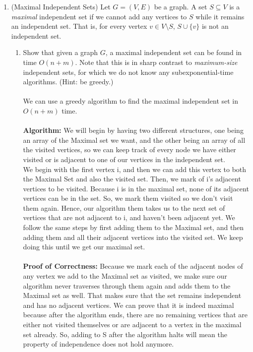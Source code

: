 \documentclass[11pt]{article}
\begin{document}
\begin{enumerate}
 \item (Maximal Independent Sets) \label{prob:maximalIS} Let $G=(V,E)$ be a graph.  A set $S\subseteq V$ is a {\em maximal} independent set if we cannot add any vertices to $S$ while it remains an independent set.  That is, for every vertex $v\in V\setminus S$, $S\cup\{v\}$ is not an independent set.
    \begin{enumerate}
        \item Show that given a graph $G$, a maximal independent set can be found in time $O(n+m)$.  Note that this is in sharp contrast to {\em maximum-size} independent sets, for which we do not know any subexponential-time algorithms. (Hint: be greedy.)
        \\\\ We can use a greedy algorithm to find the maximal independent set in $O(n + m)$ time.
        \\\\ \textbf{Algorithm: }We will begin by having two different structures, one being an array of the Maximal set we want, and the other being an array of all the visited vertices, so we can keep track of every node we have either visited or is adjacent to one of our vertices in the independent set.
        \\ We begin with the first vertex i, and then we can add this vertex to both the Maximal Set and also the visited set. Then, we mark of i's adjacent vertices to be visited. Because i is in the maximal set, none of its adjacent vertices can be in the set. So, we mark them visited so we don't visit them again. Hence, our algorithm them takes us to the next set of vertices that are not adjacent to i, and haven't been adjacent yet. We follow the same steps by first adding them to the Maximal set, and then adding them and all their adjacent vertices into the visited set. We keep doing this until we get our maximal set.
        \\\\ \textbf{Proof of Correctness: }Because we mark each of the adjacent nodes of any vertex we add to the Maximal set as visited, we make sure our algorithm never traverses through them again and adds them to the Maximal set as well. That makes sure that the set remains independent and has no adjacent vertices. We can prove that it is indeed maximal because after the algorithm ends, there are no remaining vertices that are either not visited themselves or are adjacent to a vertex in the maximal set already. So, adding to S after the algorithm halts will mean the property of independence does not hold anymore.

\end{enumerate}
\end{enumerate}
\end{document}
